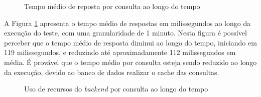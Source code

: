 \begin{figure}[H]
    \caption{Tempo médio de reposta por consulta ao longo do tempo}
    \centering
    \label{fig:search-response-over-time}
\end{figure}

A Figura \ref{fig:search-response-over-time} apresenta o tempo médio de respostas
em milissegundos ao longo da execução do teste, com uma granularidade de 1 minuto.
Nesta figura é possível perceber que o tempo médio de resposta diminui ao longo
do tempo, iniciando em 119 milissegundos, e reduzindo até aproximadamente 112
milissegundos em média. É provável que o tempo médio por consulta esteja sendo reduzido
ao longo da execução, devido ao banco de dados realizar o cache das consultas.

\begin{figure}[H]
    \caption{Uso de recursos do \emph{backend} por consulta ao longo do tempo}
    \centering
    \label{fig:resource-usage-advanced-search}
\end{figure}

